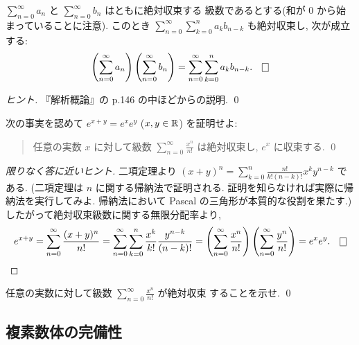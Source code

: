 \documentclass[12pt,twoside]{jarticle}
\begin{document}
\begin{question}[絶対収束級数に関する無限分配律]
 $\sum_{n=0}^\infty a_n$ と $\sum_{n=0}^\infty b_n$ はともに絶対収束する
 級数であるとする(和が $0$ から始まっていることに注意). 
 このとき $\sum_{n=0}^\infty \sum_{k=0}^n a_k b_{n-k}$ も絶対収束し, 
 次が成立する:
 \begin{equation*}
  \left(\sum_{n=0}^\infty a_n\right)
  \left(\sum_{n=0}^\infty b_n\right)
  =
  \sum_{n=0}^\infty \sum_{k=0}^n a_k b_{n-k}.
  \qed
 \end{equation*}
\end{question}

\begin{proof}[ヒント]
 『解析概論』の p.146 の中ほどからの説明. \qed
\end{proof}

\begin{question}
 次の事実を認めて $e^{x+y}=e^xe^y$ ($x,y\in{\mathbb R}$) を証明せよ:
 \begin{quote}
  任意の実数 $x$ に対して級数 $\sum_{n=0}^\infty\frac{x^n}{n!}$ 
  は絶対収束し, $e^x$ に収束する.
  \qed
 \end{quote}
\end{question}

\begin{proof}[限りなく答に近いヒント]
 二項定理より $(x+y)^n=\sum_{k=0}^n\frac{n!}{k!(n-k)!}x^ky^{n-k}$ である.
 (二項定理は $n$ に関する帰納法で証明される.
 証明を知らなければ実際に帰納法を実行してみよ.
 帰納法において Pascal の三角形が本質的な役割を果たす.)
 したがって絶対収束級数に関する無限分配率より, 
 \begin{equation*}
  e^{x+y} 
  = \sum_{n=0}^\infty\frac{(x+y)^n}{n!}
  = \sum_{n=0}^\infty\sum_{k=0}^n\frac{x^k}{k!}\frac{y^{n-k}}{(n-k)!}
  = \left(\sum_{n=0}^\infty\frac{x^n}{n!}\right)
    \left(\sum_{n=0}^\infty\frac{y^n}{n!}\right)
  = e^xe^y.
  \qed
 \end{equation*}
\end{proof}

\begin{question}
 任意の実数に対して級数 $\sum_{n=0}^\infty\frac{x^n}{n!}$ が絶対収束
 することを示せ.
 \qed
\end{question}


\subsection{複素数体の完備性}
\end{document}
